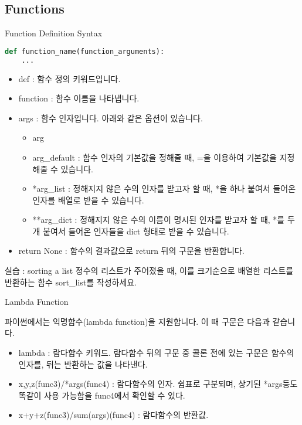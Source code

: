 \documentclass{beamer}
\begin{document}
\subsection{Functions}

\begin{frame}[fragile]{Function Definition Syntax}
\begin{lstlisting}[language=Python]
def function_name(function_arguments):
    ...
\end{lstlisting}

\begin{itemize} 
\item def : 함수 정의 키워드입니다. 
\item function : 함수 이름을 나타냅니다. 
\item args : 함수 인자입니다. 아래와 같은 옵션이 있습니다. 
\begin{itemize} 
\item arg 
\item arg\_default : 함수 인자의 기본값을 정해줄 때, =을 이용하여 기본값을 지정해줄 수 있습니다. 
\item *arg\_list : 정해지지 않은 수의 인자를 받고자 할 때, *을 하나 붙여서 들어온 인자를 배열로 받을 수 있습니다. 
\item **arg\_dict : 정해지지 않은 수의 이름이 명시된 인자를 받고자 할 때, *를 두개 붙여서 들어온 인자들을 dict 형태로 받을 수 있습니다. 
\end{itemize} 
\item return None : 함수의 결과값으로 return 뒤의 구문을 반환합니다. 
\end{itemize}
\end{frame}


\begin{frame}[fragile]{실습 : sorting a list}
정수의 리스트가 주어졌을 때, 이를 크기순으로 배열한 리스트를 반환하는 함수 sort\_list를 작성하세요. 
\end{frame}

\begin{frame}[fragile]{Lambda Function}


파이썬에서는 익명함수(lambda function)을 지원합니다. 이 때 구문은 다음과 같습니다. 
\begin{itemize} 
\item lambda : 람다함수 키워드. 람다함수 뒤의 구문 중 콜론 전에 있는 구문은 함수의 인자를, 뒤는 반환하는 값을 나타낸다. 
\item x,y,z(func3)/*args(func4) : 람다함수의 인자. 쉼표로 구분되며, 상기된 *args등도 똑같이 사용 가능함을 func4에서 확인할 수 있다. 
\item x+y+z(func3)/sum(args)(func4) : 람다함수의 반환값. 
\end{itemize}
\end{frame}
\end{document}
